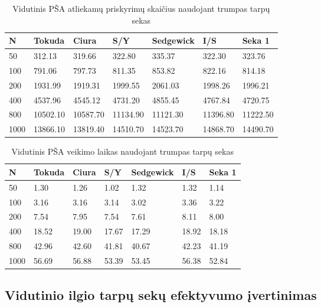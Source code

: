 \documentclass{VUMIFInfKursinis}
\begin{document}
\begin{table}[H]
  \caption{Vidutinis PŠA atliekamų priskyrimų skaičius naudojant trumpas tarpų sekas}
  \begin{tabular}{|l|l|l|l|l|l|l|}
  \hline
  N    & Tokuda   & Ciura    & S/Y      & Sedgewick & I/S      & Seka 1       \\ \hline
  50   & 312.13   & 319.66   & 322.80   & 335.37    & 322.30   & 323.76   \\ \hline
  100  & 791.06   & 797.73   & 811.35   & 853.82    & 822.16   & 814.18   \\ \hline
  200  & 1931.99  & 1919.31  & 1999.55  & 2061.03   & 1998.26  & 1996.21  \\ \hline
  400  & 4537.96  & 4545.12  & 4731.20  & 4855.45   & 4767.84  & 4720.75  \\ \hline
  800  & 10502.10 & 10587.70 & 11134.90 & 11121.30  & 11396.80 & 11222.50 \\ \hline
  1000 & 13866.10 & 13819.40 & 14510.70 & 14523.70  & 14868.70 & 14490.70 \\ \hline
  \end{tabular}
  \end{table}

\begin{table}[H]
  \caption{Vidutinis PŠA veikimo laikas naudojant trumpas tarpų sekas}
  \begin{tabular}{|l|l|l|l|l|l|l|}
  \hline
  N    & Tokuda & Ciura & S/Y   & Sedgewick & I/S   & Seka 1    \\ \hline
  50   & 1.30   & 1.26  & 1.02  & 1.32      & 1.32  & 1.14  \\ \hline
  100  & 3.16   & 3.16  & 3.14  & 3.02      & 3.36  & 3.22  \\ \hline
  200  & 7.54   & 7.95  & 7.54  & 7.61      & 8.11  & 8.00  \\ \hline
  400  & 18.52  & 19.00 & 17.67 & 17.29     & 18.92 & 18.18 \\ \hline
  800  & 42.96  & 42.60 & 41.81 & 40.67     & 42.23 & 41.19 \\ \hline
  1000 & 56.69  & 56.88 & 53.39 & 53.45     & 56.38 & 52.84 \\ \hline
  \end{tabular}
  \end{table}

\subsection{Vidutinio ilgio tarpų sekų efektyvumo įvertinimas}
\end{document}

